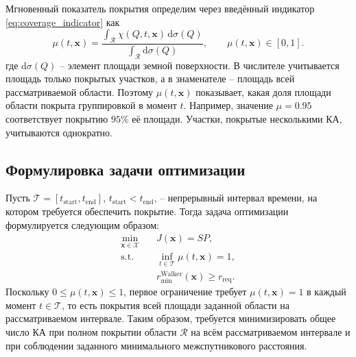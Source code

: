 Мгновенный показатель покрытия определим через введённый индикатор \eqref{eq:coverage_indicator}
как
\begin{equation}
    \mu(t,\mathbf{x})
    =\frac{\displaystyle\int_{\mathcal{R}}
        \chi(Q,t,\mathbf{x})\,\mathrm{d}\sigma(Q)}
        {\displaystyle\int_{\mathcal{R}}\mathrm{d}\sigma(Q)},
    \qquad \mu(t,\mathbf{x})\in[0,1].
    \label{eq:coverage_metric}
\end{equation}
где $\mathrm{d}\sigma(Q)$ -- элемент площади земной поверхности.
В числителе учитывается площадь только покрытых участков, а в знаменателе
-- площадь всей рассматриваемой области. Поэтому $\mu(t,\mathbf{x})$
показывает, какая доля площади области покрыта группировкой в момент $t$.
Например, значение $\mu=0.95$ соответствует покрытию $95\%$ её площади.
Участки, покрытые несколькими КА, учитываются однократно.

\subsection{Формулировка задачи оптимизации}
\label{subsec:optimization_formulation}

Пусть $\mathcal{T}=[t_{\mathrm{start}},t_{\mathrm{end}}]$,
$t_{\mathrm{start}}<t_{\mathrm{end}}$, -- непрерывный интервал времени,
на котором требуется обеспечить покрытие. Тогда задача оптимизации
формулируется следующим образом:
\begin{equation}
\label{eq:optimization_problem}
\begin{aligned}
    \min_{\mathbf{x}\in\mathcal{X}}\quad
        & J(\mathbf{x}) = SP,\\
    \text{s.t.}\quad
        & \inf_{t\in\mathcal{T}}\mu(t,\mathbf{x}) = 1,\\
        & r_{\min}^{\mathrm{Walker}}(\mathbf{x}) \geq r_{\mathrm{req}}.
\end{aligned}
\end{equation}
Поскольку $0\leq\mu(t,\mathbf{x})\leq1$, первое ограничение требует
$\mu(t,\mathbf{x})=1$ в каждый момент $t\in\mathcal{T}$, то есть покрытия
всей площади заданной области на рассматриваемом интервале.
Таким образом, требуется минимизировать общее число КА при полном покрытии
области $\mathcal{R}$ на всём рассматриваемом интервале и при соблюдении
заданного минимального межспутникового расстояния.
